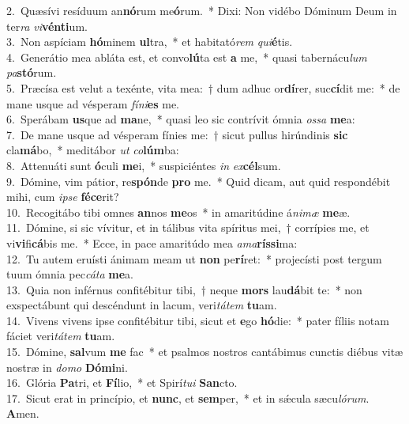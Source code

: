 {2.~}Quæsívi resíduum an\textbf{nó}rum me\textbf{ó}rum.~* Dixi: Non vidébo Dóminum Deum in ter\textit{ra} \textit{vi}\textbf{vén}\textbf{ti}um.\\
{3.~}Non aspíciam \textbf{hó}minem \textbf{ul}tra,~* et habitató\textit{rem} \textit{qui}\textbf{é}tis.\\
{4.~}Generátio mea abláta est, et convo\textbf{lú}ta est \textbf{a} me,~* quasi tabernácu\textit{lum} \textit{pa}\textbf{stó}rum.\\
{5.~}Præcísa est velut a texénte, vita mea:~† dum adhuc or\textbf{dí}rer, suc\textbf{cí}dit me:~* de mane usque ad vésperam \textit{fí}\textit{ni}\textbf{es} me.\\
{6.~}Sperábam \textbf{us}que ad \textbf{ma}ne,~* quasi leo sic contrívit ómnia \textit{os}\textit{sa} \textbf{me}a:\\
{7.~}De mane usque ad vésperam fínies me:~† sicut pullus hirúndinis \textbf{sic} cla\textbf{má}bo,~* meditábor \textit{ut} \textit{co}\textbf{lúm}ba:\\
{8.~}Attenuáti sunt \textbf{ó}culi \textbf{me}i,~* suspiciéntes \textit{in} \textit{ex}\textbf{cél}sum.\\
{9.~}Dómine, vim pátior, re\textbf{spón}de \textbf{pro} me.~* Quid dicam, aut quid respondébit mihi, cum \textit{i}\textit{pse} \textbf{fé}\textbf{ce}rit?\\
{10.~}Recogitábo tibi omnes \textbf{an}nos \textbf{me}os~* in amaritúdine á\textit{ni}\textit{mæ} \textbf{me}æ.\\
{11.~}Dómine, si sic vívitur, et in tálibus vita spíritus mei,~† corrípies me, et vi\textbf{vi}fi\textbf{cá}bis me.~* Ecce, in pace amaritúdo mea \textit{a}\textit{ma}\textbf{rís}\textbf{si}ma:\\
{12.~}Tu autem eruísti ánimam meam ut \textbf{non} pe\textbf{rí}ret:~* projecísti post tergum tuum ómnia pec\textit{cá}\textit{ta} \textbf{me}a.\\
{13.~}Quia non inférnus confitébitur tibi,~† neque \textbf{mors} lau\textbf{dá}bit te:~* non exspectábunt qui descéndunt in lacum, veri\textit{tá}\textit{tem} \textbf{tu}am.\\
{14.~}Vivens vivens ipse confitébitur tibi, sicut et \textbf{e}go \textbf{hó}die:~* pater fíliis notam fáciet veri\textit{tá}\textit{tem} \textbf{tu}am.\\
{15.~}Dómine, \textbf{sal}vum \textbf{me} fac~* et psalmos nostros cantábimus cunctis diébus vitæ nostræ in \textit{do}\textit{mo} \textbf{Dó}\textbf{mi}ni.\\
{16.~}Glória \textbf{Pa}tri, et \textbf{Fí}lio,~* et Spirí\textit{tu}\textit{i} \textbf{San}cto.\\
{17.~}Sicut erat in princípio, et \textbf{nunc}, et \textbf{sem}per,~* et in sǽcula sæcu\textit{ló}\textit{rum}. \textbf{A}men.\\
